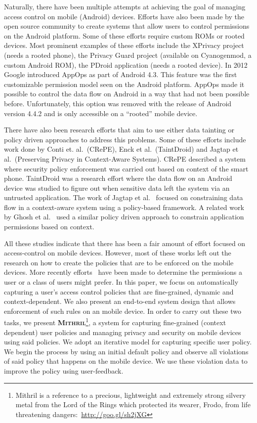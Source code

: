 Naturally, there have been multiple attempts at achieving the goal of managing access control on mobile (Android) devices. Efforts have also been made by the open source community to create systems that allow users to control permissions on the Android platform. Some of these efforts require custom ROMs or rooted devices. Most prominent examples of these efforts include the XPrivacy project (needs a rooted phone), the Privacy Guard project (available on Cyanogenmod, a custom Android ROM), the PDroid application (needs a rooted device). In 2012 Google introduced AppOps as part of Android 4.3. This feature was the first customizable permission model seen on the Android platform. AppOps made it possible to control the data flow on Android in a way that had not been possible before. Unfortunately, this option was removed with the release of Android version 4.4.2 and is only accessible on a ``rooted'' mobile device. 

There have also been research efforts that aim to use either data tainting or policy driven approaches to address this problems. Some of these efforts include work done by Conti et. al.~\cite{conti2011crepe}(CRePE), Enck et al.~\cite{enck2010taintdroid}(TaintDroid) and Jagtap et al.~\cite{Jagtap2011Privacy}(Preserving Privacy in Context-Aware Systems). CRePE described a system where security policy enforcement was carried out based on context of the smart phone. TaintDroid was a research effort where the data flow on an Android device was studied to figure out when sensitive data left the system via an untrusted application. The work of Jagtap et al.~\cite{Jagtap2011Privacy} focused on constraining data flow in a context-aware system using a policy-based framework. A related work by Ghosh et al.~\cite{ghosh2012privacy} used a similar policy driven approach to constrain application permissions based on context.

All these studies indicate that there has been a fair amount of effort focused on access-control on mobile devices. However, most of these works left out the research on how to create the policies that are to be enforced on the mobile devices. More recently efforts~\cite{Benisch2011,Sadeh2009,lin2014soups,liu2014www} have been made to determine the permissions a user or a class of users might prefer. In this paper, we focus on automatically capturing a user's access control policies that are fine-grained, dynamic and context-dependent.  We also present an end-to-end system design that allows enforcement of such rules on an mobile device. In order to carry out these two tasks, we present \textbf{\textsc{Mithril}}\footnote{Mithril is a reference to a precious, lightweight and extremely strong silvery metal from the Lord of the Rings which protected its wearer, Frodo, from life threatening dangers:~\url{http://goo.gl/sh2jXG}}, a system for capturing fine-grained (context dependent) user policies and managing privacy and security on mobile devices using said policies. We adopt an iterative model for capturing specific user policy. We begin the process by using an initial default policy and observe all violations of said policy that happens on the mobile device. We use these violation data to improve the policy using user-feedback. 

